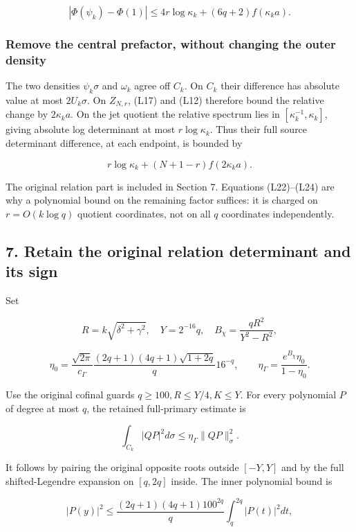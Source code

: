\documentclass[11pt,a4paper]{article}
\begin{document}
\[
|\Phi(\psi_k)-\Phi(1)|
\le4r\log\kappa_k+(6q+2)f(\kappa_k a).
\tag{L23}
\]

\subsubsection{Remove the central prefactor, without changing the outer density}\label{loc:remove-the-central-prefactor-without-changing-the-outer-density}

The two densities \(\psi_k\sigma\) and \(\omega_k\) agree off \(C_k\). On \(C_k\) their difference has absolute value at most \(2U_k\sigma\). On \(Z_{N,r}\), (L17) and (L12) therefore bound the relative change by \(2\kappa_k a\). On the jet quotient the relative spectrum lies in \([\kappa_k^{-1},\kappa_k]\), giving absolute log determinant at most \(r\log\kappa_k\). Thus their full source determinant difference, at each endpoint, is bounded by

\[
r\log\kappa_k+(N+1-r)f(2\kappa_k a).
\tag{L24}
\]

The original relation part is included in Section 7. Equations (L22)--(L24) are why a polynomial bound on the remaining factor suffices: it is charged on \(r=O(k\log q)\) quotient coordinates, not on all \(q\) coordinates independently.

\subsection{7. Retain the original relation determinant and its sign}\label{loc:retain-the-original-relation-determinant-and-its-sign}

Set

\[
R=k\sqrt{\delta^2+\gamma^2},\quad Y=2^{-16}q,\quad
B_\chi=\frac{qR^2}{Y^2-R^2},
\]

\[
\eta_0=\frac{\sqrt{2\pi}}{c_\Gamma}
\frac{(2q+1)(4q+1)\sqrt{1+2q}}q16^{-q},\qquad
\eta_\Gamma=\frac{e^{B_\chi}\eta_0}{1-\eta_0}.
\tag{L25}
\]

Use the original cofinal guards \(q\ge100,R\le Y/4,K\le Y\). For every polynomial \(P\) of degree at most \(q\), the retained full-primary estimate is

\[
\int_{C_k}|QP|^2d\sigma\le\eta_\Gamma\|QP\|_\sigma^2.
\tag{L26}
\]

It follows by pairing the original opposite roots outside \([-Y,Y]\) and by the full shifted-Legendre expansion on \([q,2q]\) inside. The inner polynomial bound is

\[
|P(y)|^2\le\frac{(2q+1)(4q+1)100^{2q}}q
\int_q^{2q}|P(t)|^2dt,
\]
\end{document}

